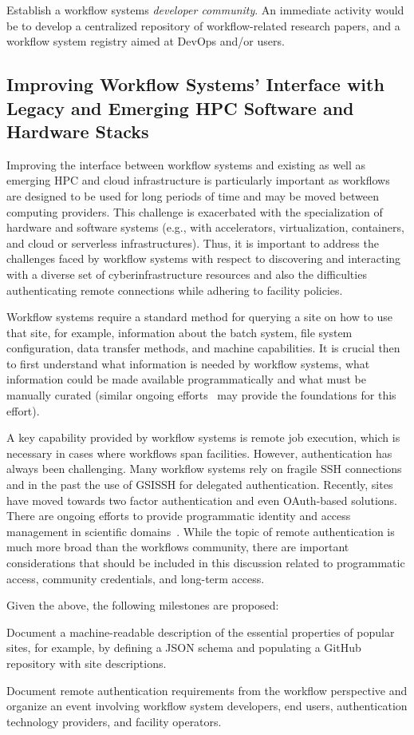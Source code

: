 Establish a workflow systems \emph{developer community}. An immediate activity would be to develop a centralized repository of workflow-related research papers, and a workflow system registry aimed at DevOps and/or users.


\subsection{Improving Workflow Systems' Interface with Legacy and Emerging HPC Software and Hardware Stacks}

Improving the interface between workflow systems and existing as well as emerging HPC and cloud infrastructure is particularly important as workflows are designed to be used for long periods of time and may be moved between computing providers. This challenge is  exacerbated with the specialization of hardware and software systems (e.g., with accelerators, virtualization, containers, and cloud or serverless infrastructures). Thus, it is important to address the challenges faced by workflow systems with respect to discovering and interacting with a diverse set of cyberinfrastructure resources and also the difficulties authenticating remote connections while adhering to facility policies.

Workflow systems require a standard method for querying a site on how to use that site, for example, information about the batch system, file system configuration, data transfer methods, and machine capabilities. It is crucial then to first understand what information is needed by workflow systems, what information could be made available programmatically and what must be manually curated (similar ongoing efforts~\cite{sgci} may provide the foundations for this effort).

A key capability provided by workflow systems is remote job execution, which is necessary in cases where workflows span facilities. However, authentication has always been challenging. Many workflow systems rely on fragile SSH connections and in the past the use of GSISSH for delegated authentication. Recently, sites have moved towards two factor authentication and even OAuth-based solutions. There are ongoing efforts to provide programmatic identity and access management in scientific domains~\cite{tuecke16globus, alt2020oauth, withers2018scitokens}. While the topic of remote authentication is much more broad than the workflows community, there are important considerations that should be included in this discussion related to programmatic access, community credentials, and long-term access. 

Given the above, the following milestones are proposed:

Document a machine-readable description of the essential properties of popular sites, for example, by defining a JSON schema and populating a GitHub repository with site descriptions.

Document remote authentication requirements from the workflow perspective and organize an event involving workflow system developers, end users, authentication technology providers, and facility operators. 

